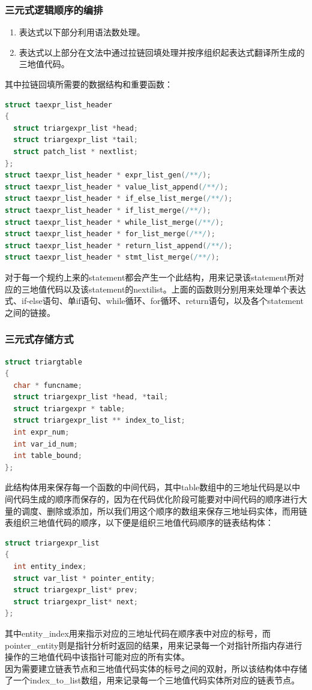 \documentclass[12pt,a4paper,Flow]{report}
\begin{document}
\subsubsection{三元式逻辑顺序的编排}
\begin{enumerate}
\item 表达式以下部分利用语法数处理。
\item 表达式以上部分在文法中通过拉链回填处理并按序组织起表达式翻译所生成的三地值代码。
\end{enumerate}
其中拉链回填所需要的数据结构和重要函数：
\begin{lstlisting}[language=c]
struct taexpr_list_header
{
  struct triargexpr_list *head;
  struct triargexpr_list *tail;
  struct patch_list * nextlist;
};
struct taexpr_list_header * expr_list_gen(/**/);
struct taexpr_list_header * value_list_append(/**/);
struct taexpr_list_header * if_else_list_merge(/**/);
struct taexpr_list_header * if_list_merge(/**/);
struct taexpr_list_header * while_list_merge(/**/);
struct taexpr_list_header * for_list_merge(/**/);
struct taexpr_list_header * return_list_append(/**/);
struct taexpr_list_header * stmt_list_merge(/**/);
\end{lstlisting}
对于每一个规约上来的statement都会产生一个此结构，用来记录该statement所对应的三地值代码以及该statement的nextilist。上面的函数则分别用来处理单个表达式、if-else语句、单if语句、while循环、for循环、return语句，以及各个statement之间的链接。

\subsubsection{三元式存储方式}
\begin{lstlisting}[language=c]
struct triargtable
{
  char * funcname;
  struct triargexpr_list *head, *tail;
  struct triargexpr * table;
  struct triargexpr_list ** index_to_list;
  int expr_num;
  int var_id_num;
  int table_bound;
};
\end{lstlisting}
此结构体用来保存每一个函数的中间代码，其中table数组中的三地址代码是以中间代码生成的顺序而保存的，因为在代码优化阶段可能要对中间代码的顺序进行大量的调度、删除或添加，所以我们用这个顺序的数组来保存三地址码实体，而用链表组织三地值代码的顺序，以下便是组织三地值代码顺序的链表结构体：
\begin{lstlisting}[language=c]
struct triargexpr_list
{
  int entity_index;
  struct var_list * pointer_entity;  
  struct triargexpr_list* prev;
  struct triargexpr_list* next;
};
\end{lstlisting}
其中entity\_index用来指示对应的三地址代码在顺序表中对应的标号，而pointer\_entity则是指针分析时返回的结果，用来记录每一个对指针所指内存进行操作的三地值代码中该指针可能对应的所有实体。\\
\indent 因为需要建立链表节点和三地值代码实体的标号之间的双射，所以该结构体中存储了一个index\_to\_list数组，用来记录每一个三地值代码实体所对应的链表节点。
\end{document}
